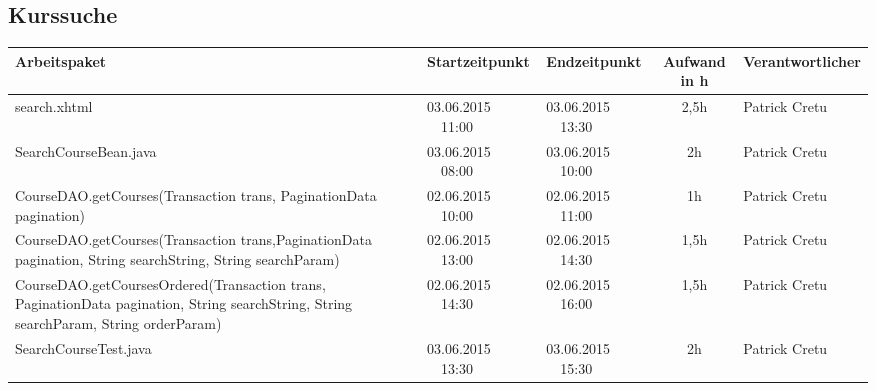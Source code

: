 \begin{landscape}
\subsection{Kurssuche}
\begin{tabular}{|p{10.3cm}|p{3.2cm}|p{3.2cm}|c|p{3.5cm}|}
	\hline  \textbf{Arbeitspaket} & \textbf{Startzeitpunkt} & \textbf{Endzeitpunkt} & \textbf{Aufwand in h} & \textbf{Verantwortlicher} \\ 
	\hline   search.xhtml                                         & 03.06.2015 \ \ 11:00        & 03.06.2015 \ \ 13:30        &  2,5h                 & Patrick Cretu\\ 
	\hline   SearchCourseBean.java                                & 03.06.2015 \ \ 08:00        & 03.06.2015 \ \ 10:00        &  2h                 & Patrick Cretu\\ 
	\hline   CourseDAO.getCourses(Transaction trans, PaginationData pagination)    & 02.06.2015 \ \ 10:00        & 02.06.2015 \ \ 11:00        &  1h                 & Patrick Cretu\\ 
	\hline  CourseDAO.getCourses(Transaction trans,PaginationData pagination, String searchString, String searchParam)& 02.06.2015 \ \ 13:00        & 02.06.2015 \ \ 14:30        &  1,5h                 & Patrick Cretu\\ 
	\hline  CourseDAO.getCoursesOrdered(Transaction trans, PaginationData pagination, String searchString, String searchParam, String orderParam)& 02.06.2015 \ \ 14:30        & 02.06.2015 \ \ 16:00        &  1,5h                 & Patrick Cretu\\ 
	\hline SearchCourseTest.java & 03.06.2015  \ \ 13:30 & 03.06.2015 \ \ 15:30 & 2h & Patrick Cretu\\
	\hline 
\end{tabular} \ \\
\ \\
\end{landscape}




